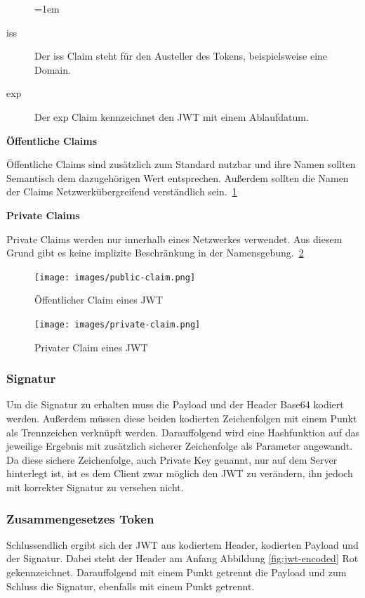 \documentclass[11pt]{article}
\begin{document}
	\begin{description}
		\leftskip=1em
		\item[iss]
		Der iss Claim steht für den Austeller des Tokens, beispielsweise eine Domain.
		\item[exp] Der exp Claim kennzeichnet den \gls{JWT} mit einem Ablaufdatum.
	\end{description}
	

	\noindent
	\textbf{Öffentliche Claims}

	Öffentliche Claims sind zusätzlich zum Standard nutzbar und ihre Namen sollten Semantisch dem dazugehörigen Wert entsprechen. Außerdem sollten die Namen der Claims Netzwerkübergreifend verständlich sein.~\ref{fig:public-claim}

	\noindent
	\textbf{Private Claims}

	Private Claims werden nur innerhalb eines Netzwerkes verwendet. Aus diesem Grund gibt es keine implizite Beschränkung in der Namensgebung.~\ref{fig:private-claim}  
	
	\begin{figure}[h]
		\centering
		\texttt{[image: images/public-claim.png]}
		\caption{Öffentlicher Claim eines \gls{JWT} }
		\label{fig:public-claim}
	\end{figure}
	
	\begin{figure}[h]
		\centering
		\texttt{[image: images/private-claim.png]}
		\caption{Privater Claim eines \gls{JWT} }
		\label{fig:private-claim}
	\end{figure}
	
	\subsubsection{Signatur}
	\label{sec: jwt_signature}
	
	Um die Signatur zu erhalten muss die Payload und der Header Base64 kodiert werden. Außerdem müssen diese beiden kodierten Zeichenfolgen mit einem Punkt als Trennzeichen verknüpft werden. Darauffolgend wird eine Hashfunktion auf das jeweilige Ergebnis mit zusätzlich sicherer Zeichenfolge als Parameter angewandt. Da diese sichere Zeichenfolge, auch Private Key genannt, nur auf dem Server hinterlegt ist, ist es dem Client zwar möglich den \gls{JWT} zu verändern, ihn jedoch mit korrekter Signatur zu versehen nicht.
	
	\subsubsection{Zusammengesetzes Token}
	\label{sec: jwt_result}
	Schlussendlich ergibt sich der \gls{JWT} aus kodiertem Header, kodierten Payload und der Signatur. Dabei steht der Header am Anfang Abbildung \ref{fig:jwt-encoded} Rot gekennzeichnet. Darauffolgend mit einem Punkt getrennt die Payload und zum Schluss die Signatur, ebenfalls mit einem Punkt getrennt.
	
\end{document}
